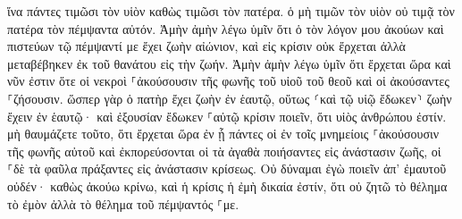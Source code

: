 \documentclass{openreader}
\begin{document}
ἵνα πάντες τιμῶσι τὸν υἱὸν καθὼς τιμῶσι τὸν πατέρα. ὁ μὴ τιμῶν τὸν υἱὸν οὐ τιμᾷ τὸν πατέρα τὸν πέμψαντα αὐτόν. 
Ἀμὴν ἀμὴν λέγω ὑμῖν ὅτι ὁ τὸν λόγον μου ἀκούων καὶ πιστεύων τῷ πέμψαντί με ἔχει ζωὴν αἰώνιον, καὶ εἰς κρίσιν οὐκ ἔρχεται ἀλλὰ μεταβέβηκεν ἐκ τοῦ θανάτου εἰς τὴν ζωήν. 
Ἀμὴν ἀμὴν λέγω ὑμῖν ὅτι ἔρχεται ὥρα καὶ νῦν ἐστιν ὅτε οἱ νεκροὶ ⸀ἀκούσουσιν τῆς φωνῆς τοῦ υἱοῦ τοῦ θεοῦ καὶ οἱ ἀκούσαντες ⸀ζήσουσιν. 
ὥσπερ γὰρ ὁ πατὴρ ἔχει ζωὴν ἐν ἑαυτῷ, οὕτως ⸂καὶ τῷ υἱῷ ἔδωκεν⸃ ζωὴν ἔχειν ἐν ἑαυτῷ· 
καὶ ἐξουσίαν ἔδωκεν ⸀αὐτῷ κρίσιν ποιεῖν, ὅτι υἱὸς ἀνθρώπου ἐστίν. 
μὴ θαυμάζετε τοῦτο, ὅτι ἔρχεται ὥρα ἐν ᾗ πάντες οἱ ἐν τοῖς μνημείοις ⸀ἀκούσουσιν τῆς φωνῆς αὐτοῦ 
καὶ ἐκπορεύσονται οἱ τὰ ἀγαθὰ ποιήσαντες εἰς ἀνάστασιν ζωῆς, οἱ ⸀δὲ τὰ φαῦλα πράξαντες εἰς ἀνάστασιν κρίσεως. 
Οὐ δύναμαι ἐγὼ ποιεῖν ἀπ’ ἐμαυτοῦ οὐδέν· καθὼς ἀκούω κρίνω, καὶ ἡ κρίσις ἡ ἐμὴ δικαία ἐστίν, ὅτι οὐ ζητῶ τὸ θέλημα τὸ ἐμὸν ἀλλὰ τὸ θέλημα τοῦ πέμψαντός ⸀με. 
\end{document}
